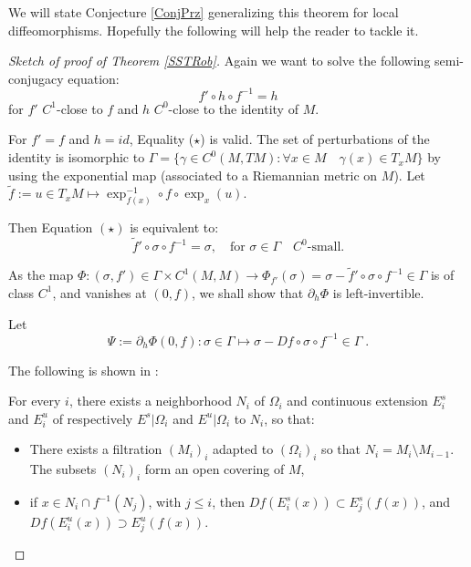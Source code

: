 \documentclass[11pt,openany,leqno]{article}
\begin{document}
We will state Conjecture \ref{ConjPrz} generalizing this theorem for local diffeomorphisms. Hopefully the following will help the reader to tackle it. 
\begin{proof}[Sketch of proof of Theorem \ref{SSTRob}]
Again we want to solve the following semi-conjugacy equation:
\begin{equation}\tag{$\star$} f'\circ h\circ f^{-1} =  h 
\end{equation}
for $f'$ $C^1$-close to $f$ and $h$ $C^0$-close to the identity of $M$. 

For  $f'=f$ and $h=id$, Equality ($\star$) is valid. The set of perturbations of the identity is isomorphic to  $\Gamma = \{ \gamma \in C^0(M, TM): \forall x \in M\quad \gamma (x) \in T_{x} M\}$ by using the exponential map (associated to a Riemannian metric on $M$). Let 
$\tilde f := u\in T_xM \mapsto \exp_{f(x)}^{-1}\circ  f \circ \exp_x(u)$.

Then Equation $(\star)$ is equivalent to:
\begin{equation}\tag{$\star\star$} \tilde f'\circ \sigma\circ f^{-1} = \sigma, \quad \text{for }\sigma \in \Gamma \quad C^0\text{-small.}
\end{equation}


As the map 
$\Phi \colon (\sigma, f')\in \Gamma \times C^1(M,M) \to 
\Phi_{f'}(\sigma)=\sigma -\tilde f'\circ \sigma \circ f^{-1}  \in \Gamma $ is of class $C^1$, 
and vanishes at $(0,f)$,  
we shall show that $\partial_h  \Phi$ is left-invertible. 

Let  
$$\Psi:=\partial_h  \Phi(0,f)\colon \sigma \in \Gamma\mapsto \sigma-
Df \circ  \sigma\circ f^{-1}   \in \Gamma \; .$$



The following is shown in \cite{Ro71}:
\begin{prop}\label{sectionEi}
For every $i$, there exists a neighborhood $N_i$ of $\Omega_i$ and  continuous extension $E^s_i$ and $E^u_i$ of respectively $E^s|\Omega_i$ and $E^u|\Omega_i$ to $N_i$, so that:
\begin{itemize}
\item There exists a filtration $(M_i)_i$ adapted to $(\Omega_i)_i$ so that $N_i= M_i\setminus M_{i-1}$. The subsets  $(N_i)_i$ form an open covering of $M$,
\item if $x\in N_i\cap f^{-1}(N_j)$, with $j\le i$, then $Df(E^s_i(x))\subset E^s_j(f(x))$, and $Df(E^u_i(x))\supset E^u_j(f(x))$.
\end{itemize}
\end{prop}


\end{proof}
\end{document}

